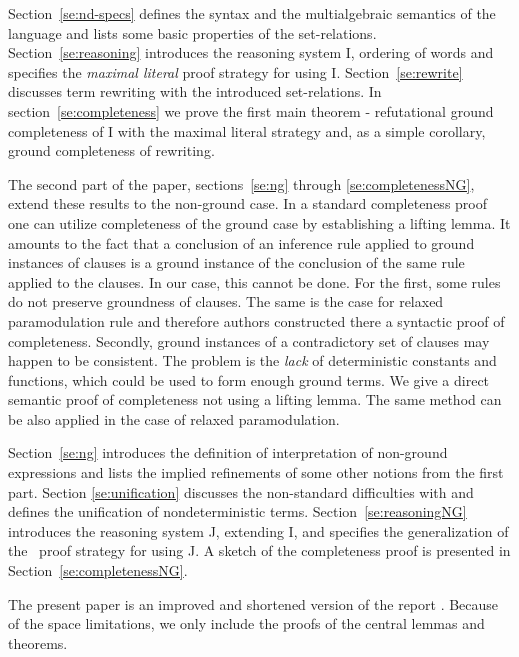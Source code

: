 Section~\ref{se:nd-specs} defines the syntax and the multialgebraic semantics 
of the language and lists some basic properties of the set-relations. 
Section~\ref{se:reasoning} introduces the reasoning system \C I, ordering of 
words and specifies the {\em maximal literal} proof strategy for using \C I.
Section~\ref{se:rewrite} discusses term rewriting with the introduced 
set-relations. In section~\ref{se:completeness} we prove the first main 
theorem - refutational
ground completeness of \C I with the maximal literal strategy and, as a simple 
corollary, ground completeness of rewriting.

The second part of the paper, sections~\ref{se:ng} through \ref{se:completenessNG},
extend these results to the non-ground case.
In a standard completeness proof one can utilize
completeness of
the ground case by establishing a lifting lemma.
It amounts to the fact 
that a conclusion of an inference rule applied to ground
instances of clauses is a ground instance of the conclusion of the same rule
applied to the clauses.  
In our case, this cannot be done.
For the first, some rules do
not preserve groundness of clauses. The same is the case for
relaxed paramodulation rule \cite {relaxed-par} and therefore
authors constructed there a syntactic proof of completeness.  
Secondly, %
ground instances of a contradictory set of clauses may happen to be consistent.
The problem is the {\em lack}
of deterministic constants and functions, which could be used to
form enough  ground terms.
We give a direct semantic proof of completeness not using a lifting lemma.
The same method can be also applied in the case of relaxed paramodulation.

Section~\ref{se:ng} introduces the definition of interpretation
of non-ground expressions and lists the implied refinements of some other notions
from the first part.
Section \ref{se:unification} discusses the
non-standard difficulties with and defines the unification of
nondeterministic terms.  Section~\ref{se:reasoningNG} introduces the
reasoning system \C J, extending \C I, and specifies the generalization of
the \strategy\ proof strategy for using \C J.
A sketch of the completeness proof is presented in
Section~\ref{se:completenessNG}.

The present paper is an improved and shortened version of the report \cite{KW}.
Because of the space limitations, we only include the proofs of the central 
lemmas and theorems.

